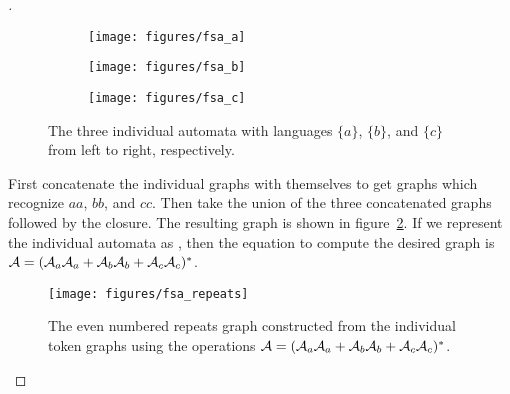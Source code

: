 \documentclass[main.tex]{subfiles}
\begin{document}
\begin{proof}[\unskip\nopunct]

\begin{figure}
    \centering
    \begin{subfigure}[b]{0.32\textwidth}
        \centering
        \texttt{[image: figures/fsa\_a]}
    \end{subfigure}
    \begin{subfigure}[b]{0.32\textwidth}
        \centering
        \texttt{[image: figures/fsa\_b]}
    \end{subfigure}
    \begin{subfigure}[b]{0.32\textwidth}
        \centering
        \texttt{[image: figures/fsa\_c]}
    \end{subfigure}
    \caption{The three individual automata with languages $\{a\}$, $\{b\}$, and
    $\{c\}$ from left to right, respectively.}
    \label{fig:fsa_tokens}
\end{figure}

First concatenate the individual graphs with themselves to get graphs which
recognize $aa$, $bb$, and $cc$. Then take the union of the three
concatenated graphs followed by the closure. The resulting graph is shown
in figure~\ref{fig:fsa_repeats}. If we represent the individual automata as
, then the equation to compute the desired graph is $\mathcal{A} = (\mathcal{A}_a\mathcal{A}_a +
\mathcal{A}_b\mathcal{A}_b + \mathcal{A}_c\mathcal{A}_c)^*$.

\begin{figure}
    \centering
    \texttt{[image: figures/fsa\_repeats]}
    \caption{The even numbered repeats graph constructed from the individual
    token graphs using the operations $\mathcal{A} = (\mathcal{A}_a\mathcal{A}_a + \mathcal{A}_b\mathcal{A}_b +
    \mathcal{A}_c\mathcal{A}_c)^*$.}
    \label{fig:fsa_repeats}
\end{figure}

\end{proof}
\end{document}
